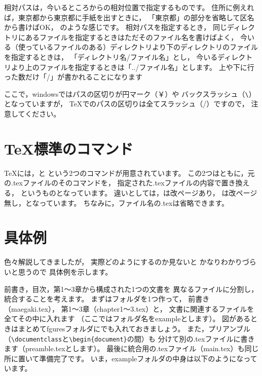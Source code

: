 \documentclass[class=jreport, crop=false, preview=false, dvipdfmx, a4paper, 14Q, fleqn]{standalone}
\begin{document}
相対パスは，今いるところからの相対位置で指定するものです。
住所に例えれば，東京都から東京都に手紙を出すときに，
「東京都」の部分を省略して区名から書けばOK，
のような感じです。
相対パスを指定するとき，
同じディレクトリにあるファイルを指定するときはただそのファイル名を書けばよく， 
今いる（使っているファイルのある）ディレクトリより下のディレクトリのファイルを指定するときは，
「ディレクトリ名/ファイル名」とし，
今いるディレクトリより上のファイルを指定するときは「../ファイル名」とします。
上や下に行った数だけ「/」が書かれることになります

ここで，windowsではパスの区切りが円マーク（￥）や
バックスラッシュ（\verb|\|）となっていますが，
{\TeX}でのパスの区切りは全てスラッシュ（/）ですので，
注意してください。



\section{\TeX 標準のコマンド}
{\TeX}には，\verb||と\verb||
という2つのコマンドが用意されています。
この2つはともに，元の.texファイルのそのコマンドを，
指定された.texファイルの内容で置き換える，
というものとなっています。
違いとしては，\verb||は改ページあり，
\verb||は改ページ無し，となっています。
ちなみに，ファイル名の.texは省略できます。



\section{具体例}
色々解説してきましたが，
実際どのようにするのか見ないと
かなりわかりづらいと思うので
具体例を示します。

前書き，目次，第1～3章から構成された1つの文書を
異なるファイルに分割し，
統合することを考えます。
まずはフォルダを1つ作って，
前書き（maegaki.tex），
第1～3章（chapter1～3.tex）と，
文書に関連するファイルを全てその中に入れます
（ここではフォルダ名をexampleとします）。
図があるときはまとめてfguresフォルダにでも入れておきましょう。
また，プリアンブル（\verb|\documentclass|と\verb|\begin{document}|の間）も
分けて別の.texファイルに書きます（preamble.texとします）。
最後に統合用の.texファイル（main.tex）も同じ所に置いて準備完了です。
いま，exampleフォルダの中身は以下のようになっています。
\end{document}
